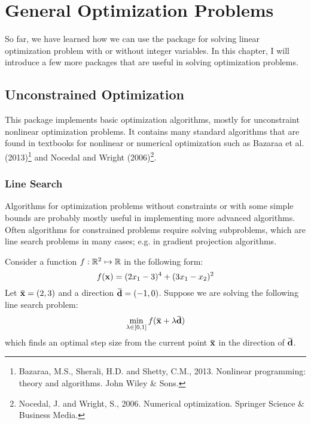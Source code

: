 \chapter{General Optimization Problems}

So far, we have learned how we can use the  package for solving linear optimization problem with or without integer variables. In this chapter, I will introduce a few more packages that are useful in solving optimization problems.

\section{Unconstrained Optimization}

This package implements basic optimization algorithms, mostly for unconstraint nonlinear optimization problems. It contains many standard algorithms that are found in textbooks for nonlinear or numerical optimization such as Bazaraa et al. (2013)\footnote{Bazaraa, M.S., Sherali, H.D. and Shetty, C.M., 2013. Nonlinear programming: theory and algorithms. John Wiley \& Sons.} and Nocedal and Wright (2006)\footnote{Nocedal, J. and Wright, S., 2006. Numerical optimization. Springer Science \& Business Media.}.

\subsection{Line Search}

Algorithms for optimization problems without constraints or with some simple bounds are probably mostly useful in implementing more advanced algorithms. Often algorithms for constrained problems require solving subproblems, which are line search problems in many cases; e.g. in gradient projection algorithms.

Consider a function $f: \mathbb{R}^2 \mapsto \mathbb{R}$ in the following form:
\begin{equation}
\label{test_function}
    f(\mathbf{x}) = (2x_1 - 3)^4 + (3x_1 - x_2)^2
\end{equation}
Let $\bar{\vect{x}}=(2,3)$ and a direction $\bar{\vect{d}}=(-1,0)$. Suppose we are solving the following line search problem:
\begin{equation*}
    \min_{\lambda\in[0,1]} f(\bar{\vect{x}}+\lambda \bar{\vect{d}})
\end{equation*}
which finds an optimal step size from the current point $\bar{\vect{x}}$ in the direction of $\bar{\vect{d}}$.

